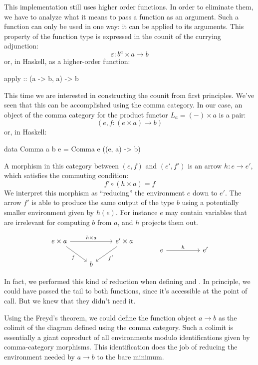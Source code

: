 \documentclass[DaoFP]{subfiles}
\begin{document}
This implementation still uses higher order functions. In order to eliminate them, we have to analyze what it means to pass a function as an argument. Such a function can only be used in one way: it can be applied to its arguments. This property of the function type is expressed in the counit of the currying adjunction:
\[ \varepsilon \colon b^a \times a \to b \]
or, in Haskell, as a higher-order function:
\begin{haskell}
apply :: (a -> b, a) -> b
\end{haskell}
This time we are interested in constructing the counit from first principles. We've seen that this can be accomplished using the comma category. In our case, an object of the comma category for the product functor $L_a = (-) \times a$ is a pair:
\[(e, f \colon (e \times a) \to b) \]
or, in Haskell:
\begin{haskell}
data Comma a b e = Comma e ((e, a) -> b)
\end{haskell}
A morphism in this category between $(e, f)$ and $(e', f')$ is an arrow $h \colon e \to e'$, which satisfies the commuting condition:
\[ f' \circ (h \times a) = f \]
We interpret this morphism as ``reducing'' the environment $e$ down to $e'$. The arrow $f'$ is able to produce the same output of the type $b$ using a potentially smaller environment given by $h (e)$. For instance $e$ may contain variables that are irrelevant for computing $b$ from $a$, and $h$ projects them out. 

\[
 \begin{tikzcd}
 e \times a
 \arrow[rd, "f"']
 \arrow[rr, "h \times a"]
 && e' \times a
 \arrow[ld, "f'"]
 \\
 &b
  \end{tikzcd}
 \hspace{30pt}
\begin{tikzcd}
 e
 \arrow[rr, "h"]
 && e'
  \end{tikzcd}
\]


In fact, we performed this kind of reduction when defining  and . In principle, we could have passed the tail  to both functions, since it's accessible at the point of call. But we knew that they didn't need it.

Using the Freyd's theorem, we could define the function object $a \to b$ as the colimit of the diagram defined using the comma category. Such a colimit is essentially a giant coproduct of all environments modulo identifications given by comma-category morphisms. This identification does the job of reducing the environment needed by $a \to b$ to the bare minimum. 
\end{document}
